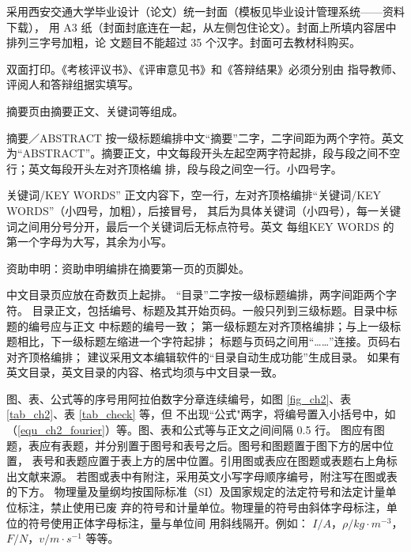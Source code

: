 


采用西安交通大学毕业设计（论文）统一封面（模板见毕业设计管理系统——资料下载）， 用 A3 纸（封面封底连在一起，从左侧包住论文）。封面上所填内容居中排列三字号加粗，论 文题目不能超过 35 个汉字。封面可去教材科购买。



双面打印。《考核评议书》、《评审意见书》和《答辩结果》必须分别由 指导教师、评阅人和答辩组据实填写。


摘要页由摘要正文、关键词等组成。

摘要／ABSTRACT 按一级标题编排中文“摘要”二字，二字间距为两个字符。英文为“ABSTRACT”。摘要正文，中文每段开头左起空两字符起排，段与段之间不空行；英文每段开头左对齐顶格编
排，段与段之间空一行。小四号字。 

关键词/KEY WORDS” 正文内容下，空一行，左对齐顶格编排“关键词/KEY WORDS”（小四号，加粗），后接冒号， 其后为具体关键词（小四号），每一关键词之间用分号分开，最后一个关键词后无标点符号。英文 每组KEY WORDS 的第一个字母为大写，其余为小写。

资助申明：资助申明编排在摘要第一页的页脚处。

中文目录页应放在奇数页上起排。 “目录”二字按一级标题编排，两字间距两个字符。 目录正文，包括编号、标题及其开始页码。一般只列到三级标题。目录中标题的编号应与正文
中标题的编号一致； 第一级标题左对齐顶格编排；与上一级标题相比，下一级标题左缩进一个字符起排； 标题与页码之间用“……”连接。页码右对齐顶格编排； 建议采用文本编辑软件的“目录自动生成功能”生成目录。 如果有英文目录，英文目录的内容、格式均须与中文目录一致。

图、表、公式等的序号用阿拉伯数字分章连续编号，如图 \ref{fig_ch2}、表 \ref{tab_ch2}、表 \ref{tab_check} 等，但
不出现“公式"两字，将编号置入小括号中，如（\ref{equ_ch2_fourier}）等。图、表和公式等与正文之间间隔 0.5 行。 图应有图题，表应有表题，并分别置于图号和表号之后。图号和图题置于图下方的居中位置，
表号和表题应置于表上方的居中位置。引用图或表应在图题或表题右上角标出文献来源。 若图或表中有附注，采用英文小写字母顺序编号，附注写在图或表的下方。 物理量及量纲均按国际标准（SI）及国家规定的法定符号和法定计量单位标注，禁止使用已废
弃的符号和计量单位。物理量的符号由斜体字母标注，单位的符号使用正体字母标注，量与单位间 用斜线隔开。例如： $I/A$，$\rho/kg \cdot m^{-3}$，$F/N$，$v/m \cdot s^{-1}$ 等等。

